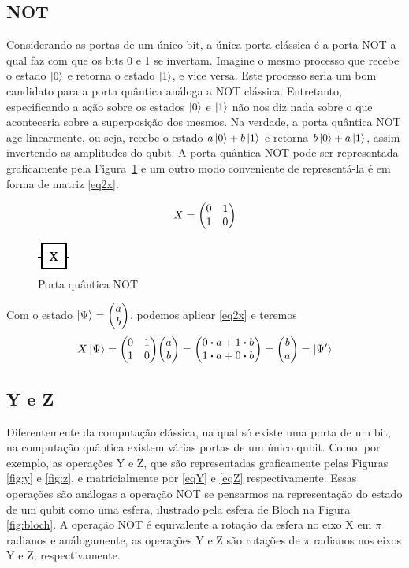 \documentclass[a4paper, 12pt, oneside]{book}
\begin{document}
\subsection{NOT} 
Considerando as portas de um único bit, a única porta clássica é a porta NOT a qual faz com que os bits 0 e 1 se invertam. Imagine o mesmo processo que recebe o estado $\ket{0}$ e retorna o estado $\ket{1}$, e vice versa. Este processo seria um bom candidato para a porta quântica análoga a NOT clássica. Entretanto, especificando a ação sobre os estados $\ket{0}$ e $\ket{1}$ não nos diz nada sobre o que aconteceria sobre a superposição dos mesmos. Na verdade, a porta quântica NOT age linearmente, ou seja, recebe o estado $a\ket{0} + b\ket{1}$ e retorna $b\ket{0} + a\ket{1}$, assim invertendo as amplitudes do qubit. A porta quântica NOT pode ser representada graficamente pela Figura~\ref{fig:not} e um outro modo conveniente de representá-la é em forma de matriz \eqref{eq2x}.

\begin{equation}\label{eq2x}
X =  \mqty(0&1\\1&0)
\end{equation}

\begin{figure}[H]
\centering
\includegraphics[scale=0.75]{x.jpg}
\caption{Porta quântica NOT}
\label{fig:not}
\end{figure}

Com o estado $\ket{\Psi} = \mqty(a\\b)$, podemos aplicar \eqref{eq2x} e teremos
\begin{align*}
X\ket{\Psi} = \mqty(0&1\\1&0)\mqty(a\\b) = \mqty(0 \vdot a+1 \vdot b \\1 \vdot a+0 \vdot b) = \mqty(b\\a) = \ket{\Psi'}
\end{align*}

\subsection{Y e Z} 
Diferentemente da computação clássica, na qual só existe uma porta de um bit, na computação quântica existem várias portas de um único qubit. Como, por exemplo, as operações Y e Z, que são representadas graficamente pelas Figuras \ref{fig:y} e \ref{fig:z}, e matricialmente por \eqref{eqY} e \eqref{eqZ} respectivamente. Essas operações são análogas a operação NOT se pensarmos na representação do estado de um qubit como uma esfera, ilustrado pela esfera de Bloch na Figura \ref{fig:bloch}. A operação NOT é equivalente a rotação da esfera no eixo X em $\pi$ radianos e análogamente, as operações Y e Z são rotações de $\pi$ radianos nos eixos Y e Z, respectivamente.
\end{document}
